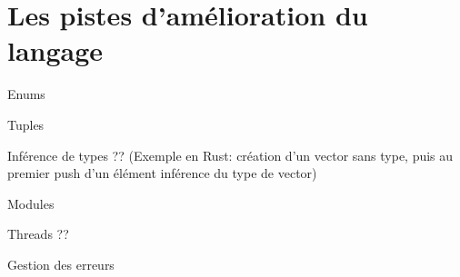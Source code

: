 \section{Les pistes d'amélioration du langage}

Enums

Tuples

Inférence de types ?? (Exemple en Rust: création d'un vector sans type, puis au premier push d'un élément inférence du type de vector)

Modules

Threads ??

Gestion des erreurs
